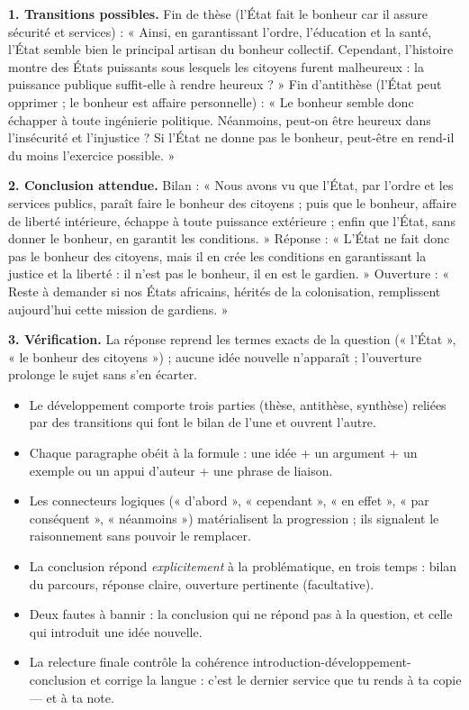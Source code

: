 \documentclass[11pt]{article}
\newcommand{\cle}[1]{{\popxbold\color{popdark}#1}}
\begin{document}
\begin{corrige}[Exercice]
\textbf{1. Transitions possibles.} Fin de thèse (l'État fait le bonheur car il assure sécurité et services) : « Ainsi, en garantissant l'ordre, l'éducation et la santé, l'État semble bien le principal artisan du bonheur collectif. Cependant, l'histoire montre des États puissants sous lesquels les citoyens furent malheureux : la puissance publique suffit-elle à rendre heureux ? » Fin d'antithèse (l'État peut opprimer ; le bonheur est affaire personnelle) : « Le bonheur semble donc échapper à toute ingénierie politique. Néanmoins, peut-on être heureux dans l'insécurité et l'injustice ? Si l'État ne donne pas le bonheur, peut-être en rend-il du moins l'exercice possible. »
\par
\textbf{2. Conclusion attendue.} Bilan : « Nous avons vu que l'État, par l'ordre et les services publics, paraît faire le bonheur des citoyens ; puis que le bonheur, affaire de liberté intérieure, échappe à toute puissance extérieure ; enfin que l'État, sans donner le bonheur, en garantit les conditions. » Réponse : « L'État ne fait donc pas le bonheur des citoyens, mais il en crée les conditions en garantissant la justice et la liberté : il n'est pas le bonheur, il en est le gardien. » Ouverture : « Reste à demander si nos États africains, hérités de la colonisation, remplissent aujourd'hui cette mission de gardiens. »
\par
\textbf{3. Vérification.} La réponse reprend les termes exacts de la question (« l'État », « le bonheur des citoyens ») ; aucune idée nouvelle n'apparaît ; l'ouverture prolonge le sujet sans s'en écarter.
\end{corrige}

\begin{aretenir}
\begin{itemize}
\item Le développement comporte trois parties (thèse, antithèse, synthèse) reliées par des \cle{transitions} qui font le bilan de l'une et ouvrent l'autre.
\item Chaque paragraphe obéit à la formule : une idée + un argument + un exemple ou un appui d'auteur + une phrase de liaison.
\item Les connecteurs logiques (« d'abord », « cependant », « en effet », « par conséquent », « néanmoins ») matérialisent la progression ; ils signalent le raisonnement sans pouvoir le remplacer.
\item La conclusion répond \emph{explicitement} à la problématique, en trois temps : bilan du parcours, réponse claire, ouverture pertinente (facultative).
\item Deux fautes à bannir : la conclusion qui ne répond pas à la question, et celle qui introduit une idée nouvelle.
\item La relecture finale contrôle la cohérence introduction-développement-conclusion et corrige la langue : c'est le dernier service que tu rends à ta copie — et à ta note.
\end{itemize}
\end{aretenir}
\end{document}
